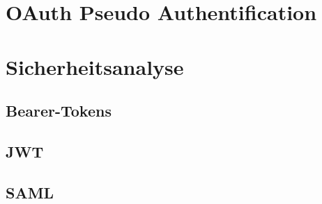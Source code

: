 \section{OAuth Pseudo Authentification}
\section{Sicherheitsanalyse}
\subsection{Bearer-Tokens}
\subsection{JWT}
\subsection{SAML}


\blindtext{}
